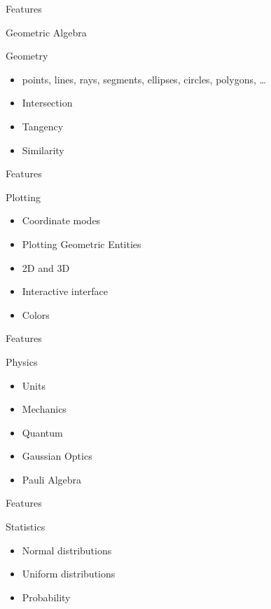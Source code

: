\documentclass[xcolor=svgnames]{beamer}
\begin{document}
\begin{frame}{Features}
  \begin{block}{Geometric Algebra}
  \end{block}

  \begin{block}{Geometry}
    \begin{itemize}
    \item points, lines, rays, segments, ellipses, circles, polygons, \ldots
    \item Intersection
    \item Tangency
    \item Similarity
    \end{itemize}
  \end{block}
\end{frame}

\begin{frame}{Features}
  \begin{block}{Plotting}
    \begin{itemize}
    \item Coordinate modes
    \item Plotting Geometric Entities
    \item 2D and 3D
    \item Interactive interface
    \item Colors
    \end{itemize}
  \end{block}
\end{frame}

\begin{frame}{Features}
  \begin{block}{Physics}
    \begin{itemize}
    \item Units
    \item Mechanics
    \item Quantum
    \item Gaussian Optics
    \item Pauli Algebra
    \end{itemize}
  \end{block}
\end{frame}

\begin{frame}{Features}
  \begin{block}{Statistics}
    \begin{itemize}
    \item Normal distributions
    \item Uniform distributions
    \item Probability
    \end{itemize}
  \end{block}
\end{frame}
\end{document}
